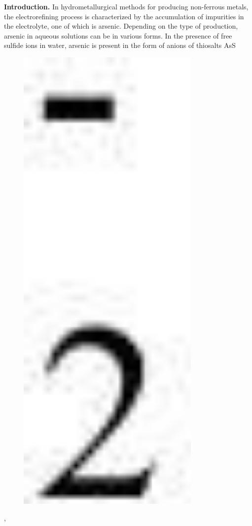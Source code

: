 {\bfseries Introduction.} In hydrometallurgical methods for producing
non-ferrous metals, the electrorefining process is characterized by the
accumulation of impurities in the electrolyte, one of which is arsenic.
Depending on the type of production, arsenic in aqueous solutions can be
in various forms. In the presence of free sulfide ions in water, arsenic
is present in the form of anions of thiosalts
AsS\begin{figure}[H]
	\centering
	\includegraphics[width=0.8\textwidth]{assets/326}
	\caption*{}
\end{figure},
